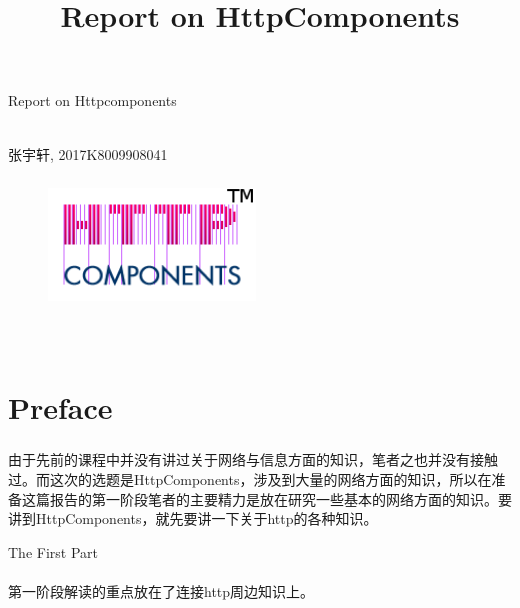 \documentclass{article}
\begin{document}
	\title{Report on HttpComponents}  %
	\begin{center}
		\huge Report on Httpcomponents\\
		\hspace*{\fill} \\ %
		\begin{CJK}{UTF8}{gbsn}
			\normalsize 张宇轩, 2017K8009908041\\
		\end{CJK}{}
	\end{center}
	\begin{figure}[H]
		\centering
		\includegraphics[height = 3.5cm, width = 5.5cm]{pics/1_httpcomponents.png}	
	\end{figure}

	\hspace*{\fill} \\ %
	
	\tableofcontents{} %
	\clearpage
	\section{Preface}
	\subparagraph{}
	\begin{CJK}{UTF8}{gbsn}
		由于先前的课程中并没有讲过关于网络与信息方面的知识，笔者之也并没有接触过。而这次的选题是HttpComponents，涉及到大量的网络方面的知识，所以在准备这篇报告的第一阶段笔者的主要精力是放在研究一些基本的网络方面的知识。要讲到HttpComponents，就先要讲一下关于http的各种知识。
	\end{CJK}{}
	\clearpage
	
	
	\begin{center}
		\Large The First Part
	\end{center}
	\paragraph{}
	\indent \indent 
	\begin{CJK}{UTF8}{gbsn}
		第一阶段解读的重点放在了连接http周边知识上。  
	\end{CJK}{}
\end{document}
